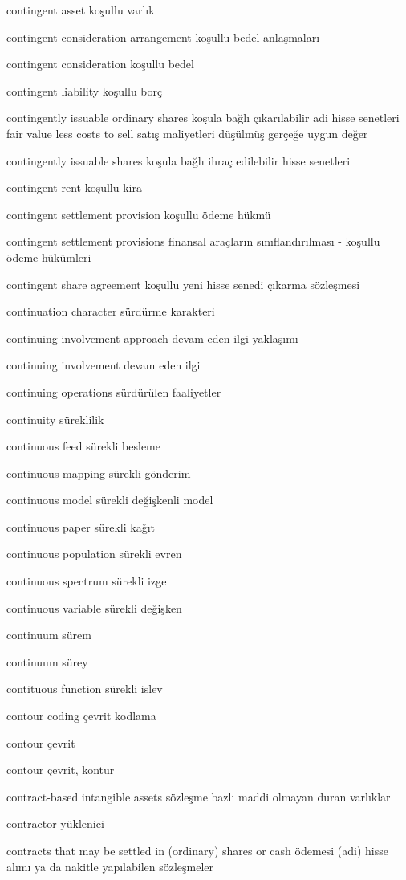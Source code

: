 \documentclass[12pt,fleqn]{article}\usepackage{../../common}
\begin{document}
contingent asset koşullu varlık

contingent consideration arrangement koşullu bedel anlaşmaları

contingent consideration koşullu bedel

contingent liability koşullu borç

contingently issuable ordinary shares koşula bağlı çıkarılabilir adi hisse senetleri fair value less costs to sell satış maliyetleri düşülmüş gerçeğe uygun değer

contingently issuable shares koşula bağlı ihraç edilebilir hisse senetleri

contingent rent koşullu kira

contingent settlement provision koşullu ödeme hükmü

contingent settlement provisions finansal araçların sınıflandırılması - koşullu ödeme hükümleri

contingent share agreement koşullu yeni hisse senedi çıkarma sözleşmesi

continuation character sürdürme karakteri

continuing involvement approach devam eden ilgi yaklaşımı

continuing involvement devam eden ilgi

continuing operations sürdürülen faaliyetler

continuity süreklilik

continuous feed sürekli besleme

continuous mapping sürekli gönderim

continuous model sürekli değişkenli model

continuous paper sürekli kağıt

continuous population sürekli evren

continuous spectrum sürekli izge

continuous variable sürekli değişken

continuum sürem

continuum sürey

contituous function sürekli islev

contour coding çevrit kodlama

contour çevrit

contour çevrit, kontur

contract-based intangible assets sözleşme bazlı maddi olmayan duran varlıklar

contractor yüklenici

contracts that may be settled in (ordinary) shares or cash ödemesi (adi) hisse alımı ya da nakitle yapılabilen sözleşmeler
\end{document}
